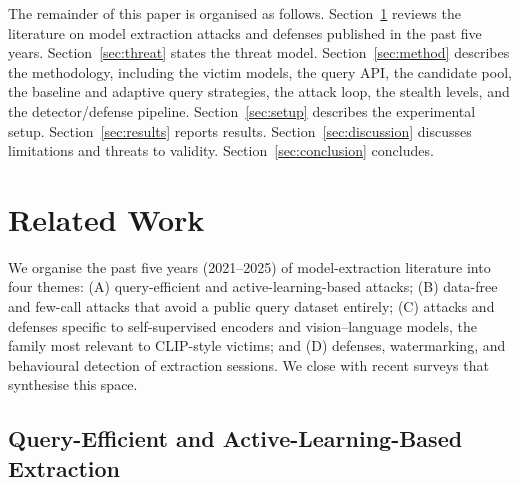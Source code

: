 \documentclass[journal,10pt]{IEEEtran}
\begin{document}
The remainder of this paper is organised as follows. Section~\ref{sec:related} reviews the
literature on model extraction attacks and defenses published in the past five years.
Section~\ref{sec:threat} states the threat model. Section~\ref{sec:method} describes the
methodology, including the victim models, the query API, the candidate pool, the baseline and
adaptive query strategies, the attack loop, the stealth levels, and the detector/defense pipeline.
Section~\ref{sec:setup} describes the experimental setup. Section~\ref{sec:results} reports
results. Section~\ref{sec:discussion} discusses limitations and threats to validity.
Section~\ref{sec:conclusion} concludes.

\section{Related Work}
\label{sec:related}

We organise the past five years (2021--2025) of model-extraction literature into four themes:
(A) query-efficient and active-learning-based attacks; (B) data-free and few-call attacks that
avoid a public query dataset entirely; (C) attacks and defenses specific to self-supervised
encoders and vision--language models, the family most relevant to CLIP-style victims; and
(D) defenses, watermarking, and behavioural detection of extraction sessions. We close with recent
surveys that synthesise this space.

\subsection{Query-Efficient and Active-Learning-Based Extraction}
\end{document}
